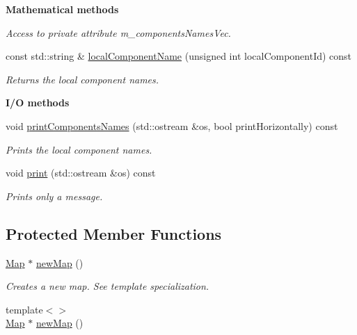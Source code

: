 \begin{Indent}{\bf Mathematical methods}
\begin{DoxyCompactItemize}
\begin{DoxyCompactList}\small\item\em Access to private attribute m\-\_\-components\-Names\-Vec. \end{DoxyCompactList}\item 
const std\-::string \& \hyperlink{class_q_u_e_s_o_1_1_vector_space_a57c65df3fa6afbcd5c019e8892f53e44}{local\-Component\-Name} (unsigned int local\-Component\-Id) const 
\begin{DoxyCompactList}\small\item\em Returns the local component names. \end{DoxyCompactList}\end{DoxyCompactItemize}
\end{Indent}
\begin{Indent}{\bf I/\-O methods}\par
\begin{DoxyCompactItemize}
\item 
void \hyperlink{class_q_u_e_s_o_1_1_vector_space_adcae173f0230ef737ea592c34cad1d09}{print\-Components\-Names} (std\-::ostream \&os, bool print\-Horizontally) const 
\begin{DoxyCompactList}\small\item\em Prints the local component names. \end{DoxyCompactList}\item 
void \hyperlink{class_q_u_e_s_o_1_1_vector_space_a3a1fe3c1833380e2a0b19d35494cb635}{print} (std\-::ostream \&os) const 
\begin{DoxyCompactList}\small\item\em Prints only a message. \end{DoxyCompactList}\end{DoxyCompactItemize}
\end{Indent}
\subsection*{Protected Member Functions}
\begin{DoxyCompactItemize}
\item 
\hyperlink{class_q_u_e_s_o_1_1_map}{Map} $\ast$ \hyperlink{class_q_u_e_s_o_1_1_vector_space_a9549041aa8525c198155e9ba530e5aa4}{new\-Map} ()
\begin{DoxyCompactList}\small\item\em Creates a new map. See template specialization. \end{DoxyCompactList}\item 
{\footnotesize template$<$$>$ }\\\hyperlink{class_q_u_e_s_o_1_1_map}{Map} $\ast$ \hyperlink{class_q_u_e_s_o_1_1_vector_space_ac8a3fcaa8d2891c2ca32733dc5a56008}{new\-Map} ()
\end{DoxyCompactItemize}
